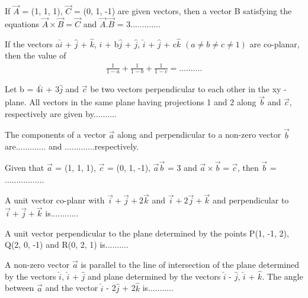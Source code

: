 \item If $\overrightarrow{A}$ = (1, 1, 1), $\overrightarrow{C}$ = (0, 1, -1) are given vectors, then a vector B satisfying the equations $\overrightarrow{A} \times \overrightarrow{B} = \overrightarrow{C}$ and 
$\overrightarrow{A} . \overrightarrow{B}$ = 3.............

\item If the vectors a$\hat{i}$ + $\hat{j}$ + $\hat{k}$, $\hat{i}$ + b$\hat{j}$ + $\hat{j}$, $\hat{i}$ + $\hat{j}$ + c$\hat{k}$ $(a \neq b \neq c \neq 1)$ are co-planar, then the value of 
\begin{align*}
\frac{1}{1 - a} + \frac{1}{1 - b} + \frac{1}{1 - c} = ..........
\end{align*}

\item Let b = 4$\hat{i}$ + 3$\hat{j}$ and $\overrightarrow{c}$ be two vectors perpendicular to each other in the xy - plane. All vectors in the same plane having projections 1 and 2 along $\overrightarrow{b}$ and $\overrightarrow{c}$, respectively are given by..........

\item The components of a vector $\overrightarrow{a}$ along and perpendicular to a non-zero vector 
$\overrightarrow{b}$ are............. and .............respectively.

\item Given that $\overrightarrow{a}$ = (1, 1, 1), $\overrightarrow{c}$ = (0, 1, -1), $\overrightarrow{a}\overrightarrow{b}$ = 3 and $\overrightarrow{a} \times \overrightarrow{b} = \overrightarrow{c}$, then $\overrightarrow{b}$ = .................

\item A unit vector co-planr with $\overrightarrow{i} + \overrightarrow{j} + 2\overrightarrow{k}$ and 
$\overrightarrow{i} + 2\overrightarrow{j} + \overrightarrow{k}$ and perpendicular to $\overrightarrow{i} + \overrightarrow{j} + \overrightarrow{k}$ is............

\item A unit vector perpendicular to the plane determined by the points P(1, -1, 2), Q(2, 0, -1) and R(0, 2, 1) is..........

\item A non-zero vector $\overrightarrow{a}$ is parallel to the line of intersection of the plane determined by the vectors $\hat{i}$, $\hat{i}$ + $\hat{j}$ and plane determined by the vectors $\hat{i}$ - $\hat{j}$, 
$\hat{i}$ + $\hat{k}$. The angle between $\overrightarrow{a}$ and the vector $\hat{i}$ - 2$\hat{j}$ + 2$\hat{k}$ is...........

